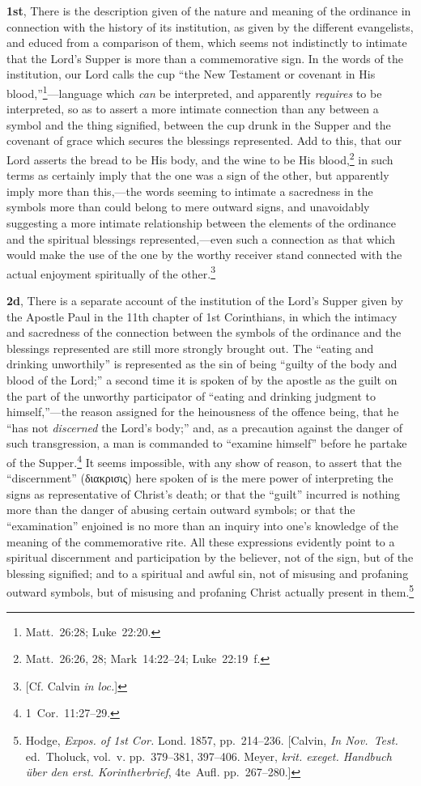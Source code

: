 \documentclass[
  english,
]{book}
\newcommand{\textgreek}[2][]{\foreignlanguage{greek}{#2}}
\newcommand{\textgerman}[2][]{\foreignlanguage{ngerman}{#2}}
\begin{document}
\textbf{1st}, There is the description given of the nature and meaning of the ordinance in connection with the history of its institution, as given by the different evangelists, and educed from a comparison of them, which seems not indistinctly to intimate that the Lord's Supper is more than a commemorative sign. In the words of the institution, our Lord calls the cup ``the New Testament or covenant in His blood,''\footnote{Matt.~26:28; Luke~22:20.}---language which \emph{can} be interpreted, and apparently \emph{requires} to be interpreted, so as to assert a more intimate connection than any between a symbol and the thing signified, between the cup drunk in the Supper and the covenant of grace which secures the blessings represented. Add to this, that our Lord asserts the bread to be His body, and the wine to be His blood,\footnote{Matt.~26:26, 28; Mark~14:22--24; Luke~22:19~f.} in such terms as certainly imply that the one was a sign of the other, but apparently imply more than this,---the words seeming to intimate a sacredness in the symbols more than could belong to mere outward signs, and unavoidably suggesting a more intimate relationship between the elements of the ordinance and the spiritual blessings represented,---even such a connection as that which would make the use of the one by the worthy receiver stand connected with the actual enjoyment spiritually of the other.\footnote{{[}Cf. Calvin \emph{in loc.}{]}}

\textbf{2d}, There is a separate account of the institution of the Lord's Supper given by the Apostle Paul in the 11th chapter of 1st Corinthians, in which the intimacy and sacredness of the connection between the symbols of the ordinance and the blessings represented are still more strongly brought out. The ``eating and drinking unworthily'' is represented as the sin of being ``guilty of the body and blood of the Lord;'' a second time it is spoken of by the apostle as the guilt on the part of the unworthy participator of ``eating and drinking judgment to himself,''---the reason assigned for the heinousness of the offence being, that he ``has not \emph{discerned} the Lord's body;'' and, as a precaution against the danger of such transgression, a man is commanded to ``examine himself'' before he partake of the Supper.\footnote{1~Cor.~11:27--29.} It seems impossible, with any show of reason, to assert that the ``discernment'' (\textgreek{διακρισις}) here spoken of is the mere power of interpreting the signs as representative of Christ's death; or that the ``guilt'' incurred is nothing more than the danger of abusing certain outward symbols; or that the ``examination'' enjoined is no more than an inquiry into one's knowledge of the meaning of the commemorative rite. All these expressions evidently point to a spiritual discernment and participation by the believer, not of the sign, but of the blessing signified; and to a spiritual and awful sin, not of misusing and profaning outward symbols, but of misusing and profaning Christ actually present in them.\footnote{Hodge, \emph{Expos. of 1st Cor.} Lond. 1857, pp.~214--236. {[}Calvin, \emph{In Nov.~Test.} ed.~Tholuck, vol.~v. pp.~379--381, 397--406. Meyer, \textgerman{\emph{krit. exeget. Handbuch über den erst. Korintherbrief}, 4te~Aufl.} pp.~267--280.{]}}
\end{document}
